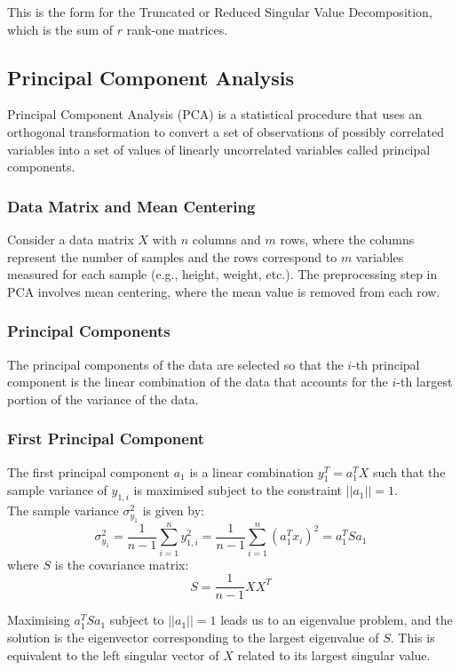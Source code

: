 This is the form for the Truncated or Reduced Singular Value Decomposition, which is the sum of \( r \) rank-one matrices.

\subsection{Principal Component Analysis}
Principal Component Analysis (PCA) is a statistical procedure that uses an orthogonal transformation to convert a set of observations of possibly correlated variables into a set of values of linearly uncorrelated variables called principal components.

\subsubsection*{Data Matrix and Mean Centering}

Consider a data matrix \( X \) with \( n \) columns and \( m \) rows, where the columns represent the number of samples and the rows correspond to \( m \) variables measured for each sample (e.g., height, weight, etc.). The preprocessing step in PCA involves mean centering, where the mean value is removed from each row.

\subsubsection*{Principal Components}

The principal components of the data are selected so that the \( i \)-th principal component is the linear combination of the data that accounts for the \( i \)-th largest portion of the variance of the data.

\subsubsection*{First Principal Component}

The first principal component \( a_1 \) is a linear combination \( y_1^T = a_1^T X \) such that the sample variance of \( y_{1,i} \) is maximised subject to the constraint \( ||a_1|| = 1 \).\\

The sample variance \( \sigma_{y_1}^2 \) is given by:
\[
\sigma_{y_1}^2 = \frac{1}{n-1} \sum_{i=1}^n y_{1,i}^2 = \frac{1}{n-1} \sum_{i=1}^n (a_1^T x_i)^2 = a_1^T S a_1
\]
where \( S \) is the covariance matrix:
\[
S = \frac{1}{n-1} XX^T
\]

Maximising \( a_1^T S a_1 \) subject to \( ||a_1|| = 1 \) leads us to an eigenvalue problem, and the solution is the eigenvector corresponding to the largest eigenvalue of \( S \). This is equivalent to the left singular vector of \( X \) related to its largest singular value.

